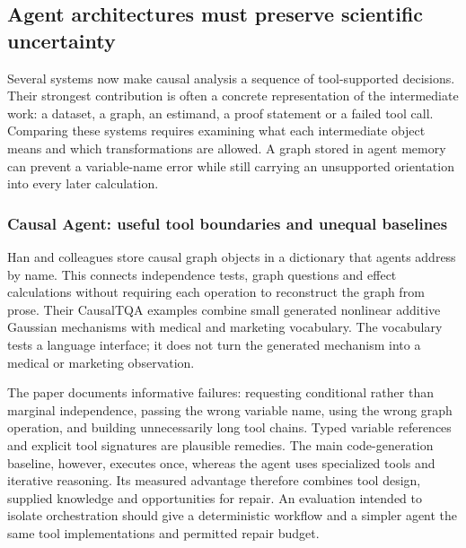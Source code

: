 \hypertarget{agent-architectures-must-preserve-scientific-uncertainty}{%
\subsection{Agent architectures must preserve scientific
uncertainty}\label{agent-architectures-must-preserve-scientific-uncertainty}}

\label{exec13:census-agents}

Several systems now make causal analysis a sequence of tool-supported
decisions. Their strongest contribution is often a concrete
representation of the intermediate work: a dataset, a graph, an
estimand, a proof statement or a failed tool call. Comparing these
systems requires examining what each intermediate object means and which
transformations are allowed. A graph stored in agent memory can prevent
a variable-name error while still carrying an unsupported orientation
into every later calculation.

\hypertarget{causal-agent-useful-tool-boundaries-and-unequal-baselines}{%
\subsubsection{Causal Agent: useful tool boundaries and unequal
baselines}\label{causal-agent-useful-tool-boundaries-and-unequal-baselines}}

Han and colleagues store causal graph objects in a dictionary that
agents address by name. This connects independence tests, graph
questions and effect calculations without requiring each operation to
reconstruct the graph from prose. Their CausalTQA examples combine small
generated nonlinear additive Gaussian mechanisms with medical and
marketing vocabulary. The vocabulary tests a language interface; it does
not turn the generated mechanism into a medical or marketing
observation. \citep{exec13_census_causal_agent}

The paper documents informative failures: requesting conditional rather
than marginal independence, passing the wrong variable name, using the
wrong graph operation, and building unnecessarily long tool chains.
Typed variable references and explicit tool signatures are plausible
remedies. The main code-generation baseline, however, executes once,
whereas the agent uses specialized tools and iterative reasoning. Its
measured advantage therefore combines tool design, supplied knowledge
and opportunities for repair. An evaluation intended to isolate
orchestration should give a deterministic workflow and a simpler agent
the same tool implementations and permitted repair budget.

